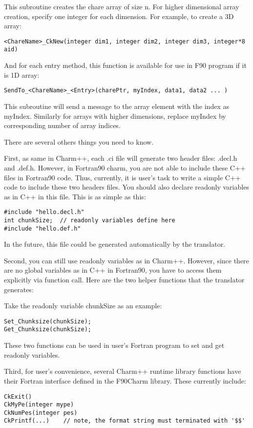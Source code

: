 \documentclass[11pt]{article}
\begin{document}
  This subroutine creates the chare array of size n. For higher dimensional
array creation, specify one integer for each dimension. For example, to create
a 3D array:

  \verb+<ChareName>_CkNew(integer dim1, integer dim2, integer dim3, integer*8 aid)+

And for each entry method, this function is available for use in F90 program
if it is 1D array:

  \verb+SendTo_<ChareName>_<Entry>(charePtr, myIndex, data1, data2 ... )+

  This subroutine will send a message to the array element with the index
as myIndex. Similarly for arrays with higher dimensions, replace myIndex by
corresponding number of array indices.

There are several others things you need to know.

First, as same in Charm++, each .ci file will generate two header files:
.decl.h and .def.h. However, in Fortran90 charm, you are not able to include 
these C++ files in Fortran90 code. Thus, currently, it is user's 
task to write a simple C++ code to include these two headers files. 
You should also declare readonly variables as in C++ in this file. This is as 
simple as this:

\begin{verbatim}
#include "hello.decl.h"
int chunkSize; 	// readonly variables define here
#include "hello.def.h"
\end{verbatim}

In the future, this file could be generated automatically by the translator.

Second, you can still use readonly variables as in Charm++. However, since
there are no global variables as in C++ in Fortran90, you have to access them
explicitly via function call. Here are the two helper functions that the 
translator generates:

Take the readonly variable chunkSize as an example:
\begin{verbatim}
Set_Chunksize(chunkSize);
Get_Chunksize(chunkSize);
\end{verbatim}
These two functions can be used in user's Fortran program to set and get 
readonly variables.

Third, for user's convenience, several Charm++ runtime library functions
have their Fortran interface defined in the F90Charm library. These currently
include:
\begin{verbatim}
CkExit()
CkMyPe(integer mype)
CkNumPes(integer pes)
CkPrintf(...)    // note, the format string must terminated with '$$'
\end{verbatim}
\end{document}
